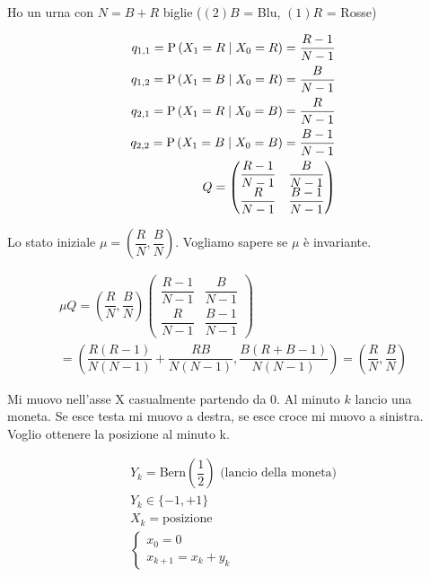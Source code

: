 \begin{exrc}
	Ho un urna con $ N = B + R$ biglie ($(2) B $ = Blu, $ (1) R $ = Rosse)
	
	\begin{equation*}
	\begin{aligned}
	q_{1,1} = \text{P}\left(X_1 = R \mid X_0 = R\right) = \dfrac{R-1}{N-1} \\
	q_{1,2} = \text{P}\left(X_1 = B \mid X_0 = R\right) = \dfrac{B}{N-1} \\
	q_{2,1} = \text{P}\left(X_1 = R \mid X_0 = B\right) = \dfrac{R}{N-1} \\
	q_{2,2} = \text{P}\left(X_1 = B \mid X_0 = B\right) = \dfrac{B-1}{N-1} \\
	Q = \begin{pmatrix}
	\dfrac{R-1}{N-1} & \dfrac{B}{N-1} \\
	\dfrac{R}{N-1} & \dfrac{B-1}{N-1}
	\end{pmatrix}
	\end{aligned}
	\end{equation*}
	
	Lo stato iniziale $ \mu = \left(\dfrac{R}{N}, \dfrac{B}{N}\right) $. Vogliamo sapere se $ \mu $ è invariante.
	
	\begin{equation*}
	\begin{aligned}
	\mu Q = \left(\dfrac{R}{N}, \dfrac{B}{N}\right)\begin{pmatrix}
	\dfrac{R-1}{N-1} & \dfrac{B}{N-1} \\
	\dfrac{R}{N-1} & \dfrac{B-1}{N-1}
	\end{pmatrix} \\
	= \left(\dfrac{R(R-1)}{N(N-1)} + \dfrac{RB}{N(N-1)}, \dfrac{B(R+B-1)}{N(N-1)}\right) = \left(\dfrac{R}{N}, \dfrac{B}{N}\right)
	\end{aligned}
	\end{equation*}
\end{exrc}

\begin{exrc}
	Mi muovo nell'asse X casualmente partendo da 0. Al minuto $ k $ lancio una moneta. Se esce testa mi muovo a destra, se esce croce mi muovo a sinistra. Voglio ottenere la posizione al minuto k.
	
	\begin{equation*}
	\begin{aligned}
	Y_k = \text{Bern}\left(\dfrac{1}{2}\right) \text{ (lancio della moneta)}\\
	Y_k \in \{-1, +1\} \\
	X_k = \text{posizione} \\
	\begin{cases}
	x_0 = 0 \\
	x_{k+1} = x_k + y_k
	\end{cases}
	\end{aligned}
	\end{equation*}
\end{exrc}

